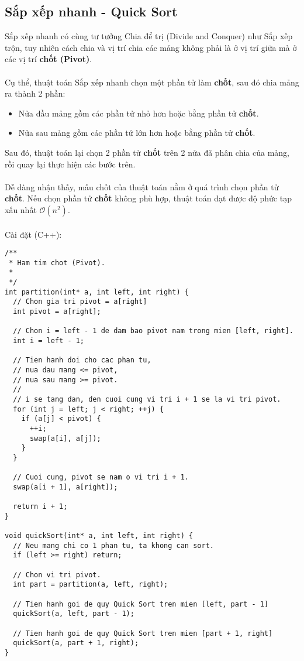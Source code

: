 \documentclass[]{article}
\begin{document}
\subsection{Sắp xếp nhanh - Quick Sort}
Sắp xếp nhanh có cùng tư tưởng Chia để trị (Divide and Conquer) như Sắp xếp trộn, tuy nhiên cách chia và vị trí chia các mảng không phải là ở vị trí giữa mà ở các vị trí \textbf{chốt (Pivot)}.
\\\\
Cụ thể, thuật toán Sắp xếp nhanh chọn một phần tử làm \textbf{chốt}, sau đó chia mảng ra thành 2 phần:
\begin{itemize}
\item Nửa đầu mảng gồm các phần tử nhỏ hơn hoặc bằng phần tử \textbf{chốt}.
\item Nửa sau mảng gồm các phần tử lớn hơn hoặc bằng phần tử \textbf{chốt}.
\end{itemize}
Sau đó, thuật toán lại chọn 2 phần tử \textbf{chốt} trên 2 nửa đã phân chia của mảng, rồi quay lại thực hiện các bước trên.
\\\\
Dễ dàng nhận thấy, mấu chốt của thuật toán nằm ở quá trình chọn phần tử \textbf{chốt}. Nếu chọn phần tử \textbf{chốt} không phù hợp, thuật toán đạt được độ phức tạp xấu nhất $\mathcal{O}(n^2)$.
\\\\
Cài đặt (C++):
\begin{lstlisting}
/**
 * Ham tim chot (Pivot).
 *
 */
int partition(int* a, int left, int right) {
  // Chon gia tri pivot = a[right]
  int pivot = a[right];

  // Chon i = left - 1 de dam bao pivot nam trong mien [left, right].
  int i = left - 1;

  // Tien hanh doi cho cac phan tu,
  // nua dau mang <= pivot,
  // nua sau mang >= pivot.
  //
  // i se tang dan, den cuoi cung vi tri i + 1 se la vi tri pivot.
  for (int j = left; j < right; ++j) {
    if (a[j] < pivot) {
      ++i;
      swap(a[i], a[j]);
    }
  }

  // Cuoi cung, pivot se nam o vi tri i + 1.
  swap(a[i + 1], a[right]);

  return i + 1;
}

void quickSort(int* a, int left, int right) {
  // Neu mang chi co 1 phan tu, ta khong can sort.
  if (left >= right) return;

  // Chon vi tri pivot.
  int part = partition(a, left, right);

  // Tien hanh goi de quy Quick Sort tren mien [left, part - 1]
  quickSort(a, left, part - 1);

  // Tien hanh goi de quy Quick Sort tren mien [part + 1, right]
  quickSort(a, part + 1, right);
}
\end{lstlisting}
\end{document}
